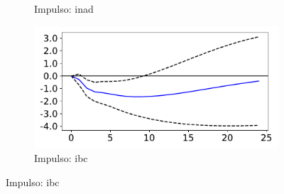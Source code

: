 \documentclass{beamer}
\begin{document}
\begin{frame}
\begin{figure}[!hbt]
\begin{subfigure}[t]{.4\linewidth}
            \caption{Impulso: inad}
        \end{subfigure}
        \begin{subfigure}[t]{.4\linewidth}
            \includegraphics[width = \textwidth, scale=1]{irf/spread_ibc.pdf}
            \caption{Impulso: ibc}
        \end{subfigure}
    \end{figure}
\end{frame}
\end{document}
